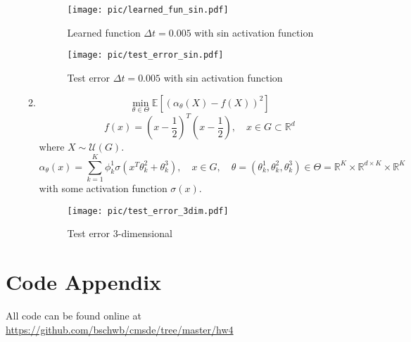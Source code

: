 \documentclass[a4paper,11pt]{scrartcl}
\newcommand*{\R}{\mathbb{R}}
\newcommand*{\EV}[1]{\mathbb{E}\left[{#1}\right]}
\newcommand*{\Dt}{\Delta{}t}
\begin{document}
\begin{enumerate}
\begin{enumerate}[leftmargin=1em]
    \begin{figure}[h]
        \begin{minipage}[b]{.5\linewidth}
          \centering
          \texttt{[image: pic/learned\_fun\_sin.pdf]}
          \caption{Learned function $\Dt=0.005$ with sin activation function}
          \label{fig:learned_fun_sin}
        \end{minipage}%
        \begin{minipage}[b]{.5\linewidth}
          \centering
          \texttt{[image: pic/test\_error\_sin.pdf]}
          \caption{Test error $\Dt=0.005$ with sin activation function}
          \label{fig:test_error_sin}
        \end{minipage}
    \end{figure}

    \item
     \[\min_{\theta\in\Theta} \EV{\left( \alpha_\theta(X) - f(X) \right)^2}\]
     \[f(x) = \left(x-\frac{1}{2}\right)^T\left(x-\frac{1}{2}\right), \quad
      x \in G \subset \R^d\]
      where $X \sim \mathcal{U}(G)$.
      \[\alpha_\theta(x) = \sum^K_{k=1}\phi_k^1\sigma\left( x^T \theta^2_k +
          \theta^3_k \right), \quad x \in G, \quad
        \theta = \left(\theta^1_k, \theta^2_k, \theta^3_k\right) \in \Theta = \R^K \times
        \R^{d\times K} \times \R^K\]
      with some activation function $\sigma(x)$.

    \begin{figure}[h]
      \centering
      \texttt{[image: pic/test\_error\_3dim.pdf]}
      \caption{Test error 3-dimensional}
      \label{fig:multidim}
    \end{figure}
\end{enumerate}

\end{enumerate}
 
\section*{Code Appendix}

All code can be found online at
\url{https://github.com/bschwb/cmsde/tree/master/hw4}




\end{document}
